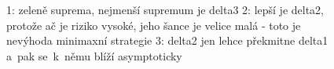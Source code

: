\begin{figure}[h]
	\centering
    \caption{1: zeleně suprema, nejmenší supremum je delta3 2: lepší je delta2, protože ač je riziko vysoké, jeho šance je velice malá - toto je nevýhoda minimaxní strategie 3: delta2 jen lehce překmitne delta1 a~pak se~k~němu blíží asymptoticky}
\end{figure}